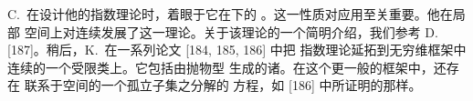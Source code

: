 C.~\trConley{}在设计他的\trHomotopy{}指数理论时，着眼于它在\trDeformation{}下的%
\trInvariance。这一性质对应用至关重要。他在局部\trCompact{}\trMetric{}%
空间上对连续\trFlow{}发展了这一理论。关于该理论的一个简明介绍，我们参考%
D.~\trSalamon{} [187]。稍后，K.~\trRybakowski{}在一系列论文 [184, 185, 186] 中把%
\trConley{}指数理论延拓到无穷维框架中连续\trSemiflow{}的一个受限类上。它包括由抛物型%
\trPartialDifferentialEquation{}生成的诸\trFlow。在这个更一般的框架中，还存在%
联系于空间的一个孤立\trCompact{}\trInvariant{}子集之\trMorse{}分解的%
\trMorse{}方程，如 [186] 中所证明的那样。
